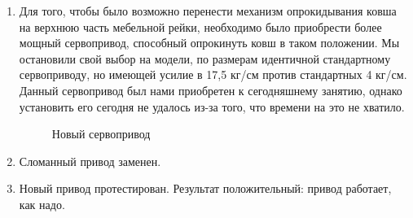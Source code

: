 \begin{enumerate}
\begin{enumerate}
	  \item Для того, чтобы было возможно перенести механизм опрокидывания ковша на верхнюю часть мебельной рейки, необходимо было приобрести более мощный сервопривод, способный опрокинуть ковш в таком положении. Мы остановили свой выбор на модели, по размерам идентичной стандартному сервоприводу, но имеющей усилие в 17,5 кг/см против стандартных 4 кг/см. Данный сервопривод был нами приобретен к сегодняшнему занятию, однако установить его сегодня не удалось из-за того, что времени на это не хватило.
	  \begin{figure}[H]
	  	\begin{minipage}[h]{1\linewidth}
	  		\caption{Новый сервопривод}
	  	\end{minipage}
	  \end{figure}
	  	
	  \item Сломанный привод заменен.
	  
	  \item Новый привод протестирован. Результат положительный: привод работает, как надо.
	  

\end{enumerate}
\end{enumerate}
